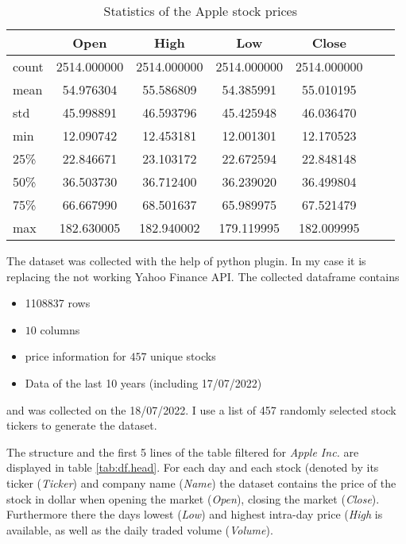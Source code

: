 \documentclass[fleqn,10pt]{SelfArx} %
\begin{document}
\begin{table*}[hbt]
	\caption{Statistics of the Apple stock prices}
	\centering
\begin{tabular}{lS[table-auto-round,table-format=9.1] S[table-auto-round,table-format=9.1] S[table-auto-round,table-format=9.1] S[table-auto-round,table-format=9.1]S[table-auto-round,scientific-notation = engineering, table-format=-1.1e-1]  S[table-auto-round,table-format=9.0]}
\toprule
{} &         {Open} &         {High} &          {Low}&        {Close}              \\
\midrule
count &  2514.000000 &  2514.000000 &  2514.000000 &  2514.000000  \\
mean  &    54.976304 &    55.586809 &    54.385991 &    55.010195 \\
std   &    45.998891 &    46.593796 &    45.425948 &    46.036470  \\
min   &    12.090742 &    12.453181 &    12.001301 &    12.170523  \\
25\%   &    22.846671 &    23.103172 &    22.672594 &    22.848148 \\
50\%   &    36.503730 &    36.712400 &    36.239020 &    36.499804  \\
75\%   &    66.667990 &    68.501637 &    65.989975 &    67.521479  \\
max   &   182.630005 &   182.940002 &   179.119995 &   182.009995  \\
\bottomrule
\end{tabular}
	\label{tab:df.statistrics}
\end{table*}


The dataset was collected with the help of  python plugin. In my case it is replacing the not working Yahoo Finance API. The collected dataframe contains
\begin{itemize}[noitemsep] %
	\item \num{1108837} rows
	\item $10$ columns
	\item price information for $457$ unique stocks
	\item Data of the last 10 years (including 17/07/2022)
\end{itemize} and was collected on the 18/07/2022. I use a list of 457 randomly selected stock tickers to generate the dataset. 

The structure and the first 5 lines of the table filtered for \textit{Apple Inc.} are displayed in table \ref{tab:df.head}. For each day and each stock (denoted by its ticker (\textit{Ticker}) and company name (\textit{Name}) the dataset contains the price of the stock in dollar 
when opening the market (\textit{Open}), closing the market (\textit{Close}). Furthermore there the days lowest (\textit{Low}) and highest 
intra-day price (\textit{High} is available, as well as the daily traded volume (\textit{Volume}).
\end{document}
